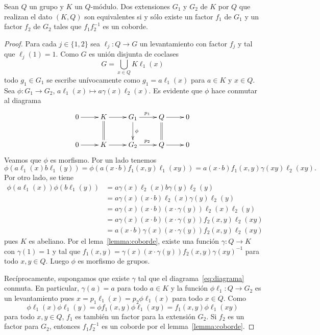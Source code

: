 \begin{lemma}
	\label{lemma:equivalencia}
	Sean $Q$ un grupo y $K$ un $Q$-módulo. Dos extensiones $G_1$ y $G_2$ de $K$ por $Q$ 
	que realizan el dato $(K,Q)$ son
	equivalentes si y sólo existe un factor  $f_1$ de $G_1$ y un factor $f_2$
	de $G_2$ tales que $f_1f_2^{-1}$ es un coborde.
\end{lemma}

\begin{proof}
	Para cada $j\in\{1,2\}$ sea $\ell_j\colon Q\to G$ un levantamiento con
	factor $f_j$ y tal que $\ell_j(1)=1$. 
	Como $G$ es unión disjunta de coclases
	\[
	G=\bigcup_{x\in Q}K\ell_1(x)
	\]
	todo $g_1\in G_1$ se escribe unívocamente como $g_1=a\ell_1(x)$ para $a\in
	K$ y $x\in Q$. Sea $\phi\colon G_1\to G_2$, $a\ell_1(x)\mapsto
	a\gamma(x)\ell_2(x)$. Es evidente que $\phi$ hace conmutar al diagrama
	\begin{equation}
		\label{eq:diagrama}
	\xymatrix{
	0\ar[r] 
	& K
	\ar@{=}[d]
	\ar[r]%
	& G_1
	\ar[r]^{p_1}
	\ar[d]^\phi
	& Q\ar[r]
	\ar@{=}[d]
	& 0
	\\
	0\ar[r] 
	& K
	\ar[r]
	& G_2
	\ar[r]^{p_2}
	& Q\ar[r]
	& 0
	}
	\end{equation}
	Veamos que $\phi$ es morfismo. Por un lado tenemos
	\[
		\phi(a\ell_1(x)b\ell_1(y))=\phi(a(x\cdot b)f_1(x,y)\ell_1(xy))=a(x\cdot b)f_1(x,y)\gamma(xy)\ell_2(xy).
	\]
	Por otro lado, se tiene 
	\begin{align*}
		\phi(a\ell_1(x))\phi(b\ell_1(y))
		&=a\gamma(x)\ell_2(x)b\gamma(y)\ell_2(y)\\
		&=a\gamma(x)(x\cdot b)\ell_2(x)\gamma(y)\ell_2(y)\\
		&=a\gamma(x)(x\cdot b)(x\cdot \gamma(y))\ell_2(x)\ell_2(y)\\
		&=a\gamma(x)(x\cdot b)(x\cdot \gamma(y))f_2(x,y)\ell_2(xy)\\
		&=a(x\cdot b)\gamma(x)(x\cdot \gamma(y))f_2(x,y)\ell_2(xy)
	\end{align*}
	pues $K$ es abeliano.  Por el lema~\ref{lemma:coborde}, existe una función
	$\gamma\colon Q\to K$ con $\gamma(1)=1$ y tal que  
	$f_1(x,y)=\gamma(x)(x\cdot \gamma(y))f_2(x,y)\gamma(xy)^{-1}$ 
	para todo $x,y\in Q$. Luego $\phi$ es morfismo de grupos. 

	Recíprocamente, supongamos que existe $\gamma$ tal que el
	diagrama~\eqref{eq:diagrama} conmuta. En particular, $\gamma(a)=a$ para
	todo $a\in K$ y la función $\phi\ell_1\colon Q\to G_2$ es un levantamiento pues 
	$x=p_1\ell_1(x)=p_2\phi\ell_1(x)$ 
	para todo $x\in Q$. Como
	\[
	\phi\ell_1(x)\phi\ell_1(y)=\phi f_1(x,y)\phi\ell_1(xy)=f_1(x,y)\phi\ell_1(xy)
	\]
	para todo $x,y\in Q$, $f_1$ es también un factor para la extensión $G_2$.
	Si $f_2$ es un factor para $G_2$, entonces $f_1f_2^{-1}$ es un coborde por
	el lemma~\ref{lemma:coborde}. 
\end{proof}


